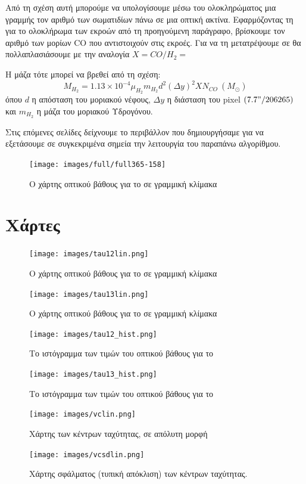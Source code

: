 \documentclass[a4paper,12pt]{memoir}
\newcommand{\e}[1]{\times 10^{#1}}
\begin{document}
Από τη σχέση αυτή μπορούμε να υπολογίσουμε μέσω του ολοκληρώματος μια γραμμής τον αριθμό των σωματιδίων πάνω σε μια οπτική ακτίνα. Εφαρμόζοντας τη για το ολοκλήρωμα των εκροών από τη προηγούμενη παράγραφο, βρίσκουμε τον αριθμό των μορίων CO που αντιστοιχούν στις εκροές. Για να τη μετατρέψουμε σε  θα πολλαπλασιάσουμε με την αναλογία $X=CO/H_2=$ 

Η μάζα τότε μπορεί να βρεθεί από τη σχέση:
\begin{equation}
M_{H_2}=1.13\e{-4} \mu _{H_2} m_{H_2} d^2 (\Delta y )^2 X N_{CO} \ \left(M_{\odot} \right) 
\end{equation}
όπου $d$ η απόσταση του μοριακού νέφους, $\Delta y$ η διάσταση του pixel $(7.7"/206265)$ και $m_{H_2}$ η μάζα του μοριακού Υδρογόνου.

Στις επόμενες σελίδες δείχνουμε το περιβάλλον που δημιουργήσαμε για να εξετάσουμε σε συγκεκριμένα σημεία την λειτουργία του παραπάνω αλγορίθμου.

\newpage


\begin{figure}[h]
	\centering
	\texttt{[image: images/full/full365-158]}
	\caption{Ο χάρτης οπτικού βάθους για το  σε γραμμική κλίμακα}
\end{figure}



\section{Χάρτες}
\begin{figure}[h]
	\centering
	\texttt{[image: images/tau12lin.png]}
	\caption{Ο χάρτης οπτικού βάθους για το  σε γραμμική κλίμακα}
	\centering
	\texttt{[image: images/tau13lin.png]}
	\caption{Ο χάρτης οπτικού βάθους για το  σε γραμμική κλίμακα}
\end{figure}

\begin{figure}[h]
	\centering
	\texttt{[image: images/tau12\_hist.png]}
	\caption{Το ιστόγραμμα των τιμών του οπτικού βάθους για το }
	\centering
	\texttt{[image: images/tau13\_hist.png]}
	\caption{Το ιστόγραμμα των τιμών του οπτικού βάθους για το }
\end{figure}

\begin{figure}[h]
	\centering
	\texttt{[image: images/vclin.png]}
	\caption{Χάρτης των κέντρων ταχύτητας, σε απόλυτη μορφή}
	
	\centering
	\texttt{[image: images/vcsdlin.png]}
	\caption{Χάρτης σφάλματος (τυπική απόκλιση) των κέντρων ταχύτητας.}
\end{figure}
\end{document}
